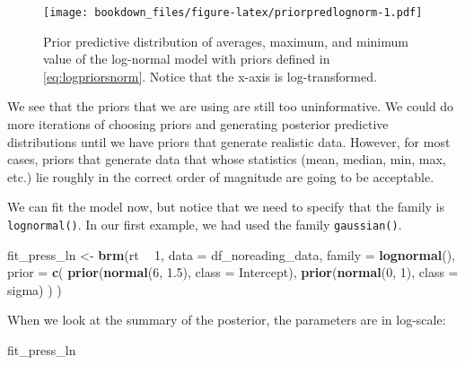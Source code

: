 \documentclass[12pt,]{krantz}
\newenvironment{Shaded}{\begin{snugshade}}{\end{snugshade}}
\newcommand{\DataTypeTok}[1]{\textcolor[rgb]{0.13,0.29,0.53}{#1}}
\newcommand{\DecValTok}[1]{\textcolor[rgb]{0.00,0.00,0.81}{#1}}
\newcommand{\FloatTok}[1]{\textcolor[rgb]{0.00,0.00,0.81}{#1}}
\newcommand{\KeywordTok}[1]{\textcolor[rgb]{0.13,0.29,0.53}{\textbf{#1}}}
\newcommand{\NormalTok}[1]{#1}
\newcommand{\OperatorTok}[1]{\textcolor[rgb]{0.81,0.36,0.00}{\textbf{#1}}}
\newcommand{\StringTok}[1]{\textcolor[rgb]{0.31,0.60,0.02}{#1}}
\theoremstyle{definition}
\theoremstyle{definition}
\theoremstyle{definition}
\theoremstyle{remark}
\begin{document}
\begin{figure}
\centering
\texttt{[image: bookdown\_files/figure-latex/priorpredlognorm-1.pdf]}
\caption{\label{fig:priorpredlognorm}Prior predictive distribution of averages, maximum, and minimum value of the log-normal model with priors defined in \eqref{eq:logpriorsnorm}. Notice that the x-axis is log-transformed.}
\end{figure}

We see that the priors that we are using are still too uninformative. We could do more iterations of choosing priors and generating posterior predictive distributions until we have priors that generate realistic data. However, for most cases, priors that generate data that whose statistics (mean, median, min, max, etc.) lie roughly in the correct order of magnitude are going to be acceptable.

We can fit the model now, but notice that we need to specify that the family is \texttt{lognormal()}. In our first example, we had used the family \texttt{gaussian()}.

\begin{Shaded}
\begin{Highlighting}[]
\NormalTok{fit_press_ln <-}\StringTok{ }\KeywordTok{brm}\NormalTok{(rt }\OperatorTok{~}\StringTok{ }\DecValTok{1}\NormalTok{,}
  \DataTypeTok{data =}\NormalTok{ df_noreading_data,}
  \DataTypeTok{family =} \KeywordTok{lognormal}\NormalTok{(),}
  \DataTypeTok{prior =} \KeywordTok{c}\NormalTok{(}
    \KeywordTok{prior}\NormalTok{(}\KeywordTok{normal}\NormalTok{(}\DecValTok{6}\NormalTok{, }\FloatTok{1.5}\NormalTok{), }\DataTypeTok{class =}\NormalTok{ Intercept),}
    \KeywordTok{prior}\NormalTok{(}\KeywordTok{normal}\NormalTok{(}\DecValTok{0}\NormalTok{, }\DecValTok{1}\NormalTok{), }\DataTypeTok{class =}\NormalTok{ sigma)}
\NormalTok{  )}
\NormalTok{)}
\end{Highlighting}
\end{Shaded}

When we look at the summary of the posterior, the parameters are in log-scale:

\begin{Shaded}
\begin{Highlighting}[]
\NormalTok{fit_press_ln}
\end{Highlighting}
\end{Shaded}
\end{document}

